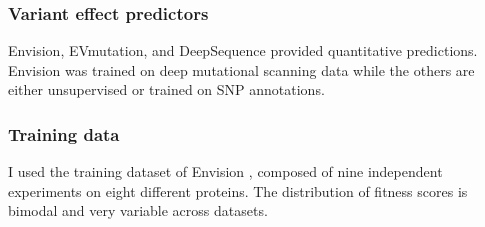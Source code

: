 \documentclass[10pt, british]{beamer}
\begin{document}
\begin{frame}
	\frametitle{Variant effect predictors}
	\begin{figure}
		
	\end{figure}
	\vfill%
	Envision, EVmutation, and DeepSequence provided quantitative predictions.
	Envision was trained on deep mutational scanning data while the others are either unsupervised or trained on SNP annotations.
\end{frame}

\begin{frame}
	\frametitle{Training data}
	I used the training dataset of Envision \parencite{Gray2018}, composed of nine independent experiments on eight different proteins.
	The distribution of fitness scores is bimodal and very variable across datasets.
	\vfill%
	\centering%
	
	
\end{frame}
%
%	
%
%	
%
%	
%
%	
%
\end{document}
